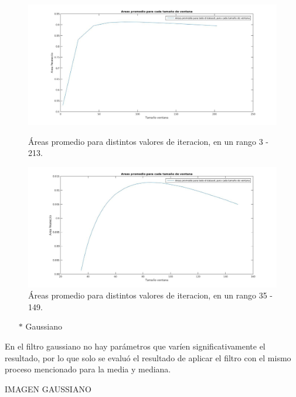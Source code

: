 \begin{figure}[H]
	{
	\centering
	\includegraphics[width=1\textwidth]{Figures/MediaRangoGrandeHRF}
	\caption[Media HRF]{\'Areas promedio para distintos valores de iteracion, en un rango 3 - 213.}
	\label{fig:MediaRangoGrandeHRF}
	
	\includegraphics[width=1\textwidth]{Figures/MediaRangoChicoHRF}
	\caption[Media HRF]{\'Areas promedio para distintos valores de iteracion, en un rango 35 - 149.}
	\label{fig:MediaRangoChicoHRF}
	}
\end{figure}

\begin{itemize}
	\item[$*$]Gaussiano
\end{itemize}

En el filtro gaussiano no hay parámetros que varíen significativamente el resultado, por lo que solo se evaluó el resultado de aplicar el filtro con el mismo proceso mencionado para la media y mediana.

IMAGEN GAUSSIANO


